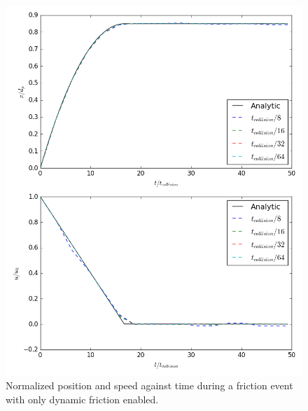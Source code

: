\documentclass[10pt,a4paper,titlepage]{report}
\begin{document}
\begin{figure}[!htb]
\centering
\includegraphics[scale=0.5]{figures/friction_verification_dynamic_only.png}
\caption{Normalized position and speed against time during a friction event with only dynamic friction enabled.}
\label{fig:friction_verification_dynamic_only}
\end{figure}
\end{document}
